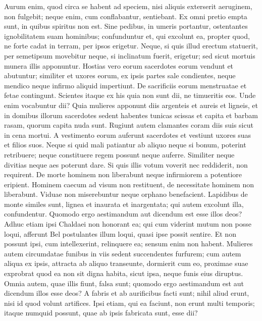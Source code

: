 \begin{biblechapter}
\verse Aurum enim, quod circa se habent ad speciem, nisi aliquis exterserit aeruginem, non fulgebit; neque enim, cum conflabantur, sentiebant. 
\verse Ex omni pretio empta sunt, in quibus spiritus non est. 
\verse Sine pedibus, in umeris portantur, ostentantes ignobilitatem suam hominibus; confunduntur et, qui excolunt ea, 
\verse propter quod, ne forte cadat in terram, per ipsos erigetur. Neque, si quis illud erectum statuerit, per semetipsum movebitur neque, si inclinatum fuerit, erigetur; sed sicut mortuis munera illis apponuntur. 
\verse Hostias vero eorum sacerdotes eorum vendunt et abutuntur; similiter et uxores eorum, ex ipsis partes sale condientes, neque mendico neque infirmo aliquid impertiunt. De sacrificiis eorum menstruatae et fetae contingunt. 
\verse Scientes itaque ex his quia non sunt dii, ne timueritis eos. 
\verse Unde enim vocabuntur dii? Quia mulieres apponunt diis argenteis et aureis et ligneis, 
\verse et in domibus illorum sacerdotes sedent habentes tunicas scissas et capita et barbam rasam, quorum capita nuda sunt. 
\verse Rugiunt autem clamantes coram diis suis sicut in cena mortui. 
\verse A vestimento eorum auferunt sacerdotes et vestiunt uxores suas et filios suos. 
\verse Neque si quid mali patiantur ab aliquo neque si bonum, poterint retribuere; neque constituere regem possunt neque auferre. 
\verse Similiter neque divitias neque aes poterunt dare. Si quis illis votum voverit nec reddiderit, non requirent. 
\verse De morte hominem non liberabunt neque infirmiorem a potentiore eripient. 
\verse Hominem caecum ad visum non restituent, de necessitate hominem non liberabunt. 
\verse Viduae non miserebuntur neque orphano benefacient. 
\verse Lapidibus de monte similes sunt, lignea et inaurata et inargentata; qui autem excolunt illa, confundentur. 
\verse Quomodo ergo aestimandum aut dicendum est esse illos deos? 
\verse Adhuc etiam ipsi Chaldaei non honorant ea; qui cum viderint mutum non posse loqui, afferunt Bel postulantes illum loqui, 
\verse quasi ipse possit sentire. Et non possunt ipsi, cum intellexerint, relinquere ea; sensum enim non habent.  
\verse Mulieres autem circumdatae funibus in viis sedent succendentes furfurem;  
\verse cum autem aliqua ex ipsis, attracta ab aliquo transeunte, dormierit cum eo, proximae suae exprobrat quod ea non sit digna habita, sicut ipsa, neque funis eius diruptus. 
\verse Omnia autem, quae illis fiunt, falsa sunt; quomodo ergo aestimandum est aut dicendum illos esse deos? 
\verse A fabris et ab aurificibus facti sunt; nihil aliud erunt, nisi id quod volunt artifices. 
\verse Ipsi etiam, qui ea faciunt, non erunt multi temporis; itaque numquid possunt, quae ab ipsis fabricata sunt, esse dii? 

\end{biblechapter}
